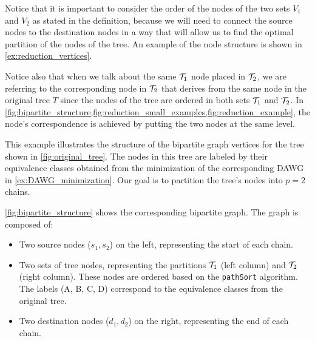 Notice that it is important to consider the order of the nodes of the two sets $V_1$ and $V_2$ as stated in the definition, because we will need to connect the source nodes to the destination nodes in a way that will allow us to find the optimal partition of the nodes of the tree. An example of the node structure is shown in \cref{ex:reduction_vertices}.

Notice also that when we talk about the same $\treeset{1}$ node placed in $\treeset{2}$, we are referring to the corresponding node in $\treeset{2}$ that derives from the same node in the original tree $T$ since the nodes of the tree are ordered in both sets $\treeset{1}$ and $\treeset{2}$. In \cref{fig:bipartite_structure,fig:reduction_small_examples,fig:reduction_example}, the node's correspondence is achieved by putting the two nodes at the same level.
\begin{example}[Vertices] \label{ex:reduction_vertices}
    This example illustrates the structure of the bipartite graph vertices for the tree shown in \cref{fig:original_tree}. The nodes in this tree are labeled by their equivalence classes obtained from the minimization of the corresponding DAWG in \cref{ex:DAWG_minimization}. Our goal is to partition the tree's nodes into $p=2$ chains.

    \cref{fig:bipartite_structure} shows the corresponding bipartite graph. The graph is composed of:
    \begin{itemize}
        \item Two source nodes ($s_1, s_2$) on the left, representing the start of each chain.
        \item Two sets of tree nodes, representing the partitions $\treeset{1}$ (left column) and $\treeset{2}$ (right column). These nodes are ordered based on the \texttt{pathSort} algorithm. The labels (A, B, C, D) correspond to the equivalence classes from the original tree.
        \item Two destination nodes ($d_1, d_2$) on the right, representing the end of each chain.
    \end{itemize}

    \begin{figure}[H]
        \centering
        \begin{tikzpicture}[
            level distance=1.5cm,
            sibling distance=3cm,
            state/.style={circle, draw, minimum size=7mm},
            accepting/.style={circle, draw, double, minimum size=7mm},
            edge from parent/.style={draw, -latex},
            level 1/.style={sibling distance=4cm},
            level 2/.style={sibling distance=2.5cm},
            level 3/.style={sibling distance=2cm}
            ]
        

\end{tikzpicture}
\end{figure}
\end{example}
